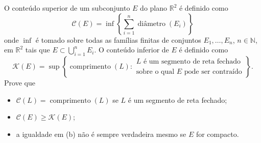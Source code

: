 O conteúdo superior de um subconjunto \(E\) do plano \(\mathbb{R}^{2}\) é definido como
\[\mathcal{C}(E)=\inf\left\{\sum_{i=1}^{n} \operatorname{diâmetro}(E_{i})\right\}\] onde \(\inf\) é tomado sobre todas as famílias finitas de conjuntos \(E_{1},\dots,E_{n}\), \(n\in \mathbb{N}\), em \(\mathbb{R}^{2}\) tais que \(E\subset \bigcup_{i=1}^{n}E_{i}\).
O conteúdo inferior de \(E\) é definido como
\[\mathcal{K}(E)=\sup\left\{\operatorname{comprimento}(L) : \begin{array}{l} \text{\(L\) é um segmento de reta fechado} \\ \text{sobre o qual \(E\) pode ser contraído} \end{array} \right\}.\]
Prove que
\begin{itemize}
\item[(a)] \(\mathcal{C}(L)=\operatorname{comprimento}(L)\) se \(L\) é um segmento de reta fechado;
\item[(b)] \(\mathcal{C}(E) \geq \mathcal{K}(E)\);
\item[(c)] a igualdade em (b) não é sempre verdadeira mesmo se \(E\) for compacto.
\end{itemize}
